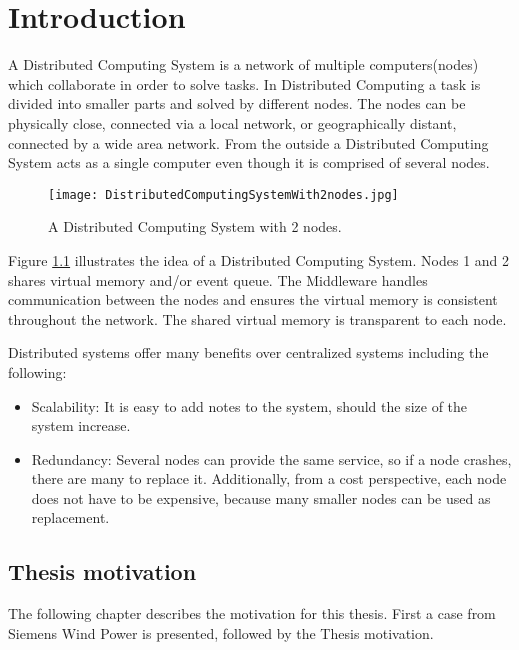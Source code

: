 \chapter{Introduction}

A Distributed Computing System is a network of multiple computers(nodes) which collaborate in order to solve tasks. In Distributed Computing a task is divided into smaller parts and solved by different nodes. The nodes can be physically close, connected via a local network, or geographically distant, connected by a wide area network. From the outside a Distributed Computing System acts as a single computer even though it is comprised of several nodes.

\begin{figure}
	\centering
	\texttt{[image: DistributedComputingSystemWith2nodes.jpg]} 
	\caption[Distributed Computing System with 2 nodes]{
		\label{fig:distributedCoputingSystem} 
		\footnotesize{%
			A Distributed Computing System with 2 nodes.
		}
	}
\end{figure}

Figure \cref{fig:distributedCoputingSystem} illustrates the idea of a Distributed Computing System. Nodes 1 and 2 shares virtual memory and/or event queue. The Middleware handles communication between the nodes and ensures the virtual memory is consistent throughout the network. The shared virtual memory is transparent to each node. 

Distributed systems offer many benefits over centralized systems including the following:
\begin{itemize}
	\item Scalability: It is easy to add notes to the system, should the size of the system increase.
	\item Redundancy: Several nodes can provide the same service, so if a node crashes, there are many to replace it. Additionally, from a cost perspective, each node does not have to be expensive, because many smaller nodes can be used as replacement.
\end{itemize}

\section{Thesis motivation}
The following chapter describes the motivation for this thesis. First a case from Siemens Wind Power is presented, followed by the Thesis motivation.

